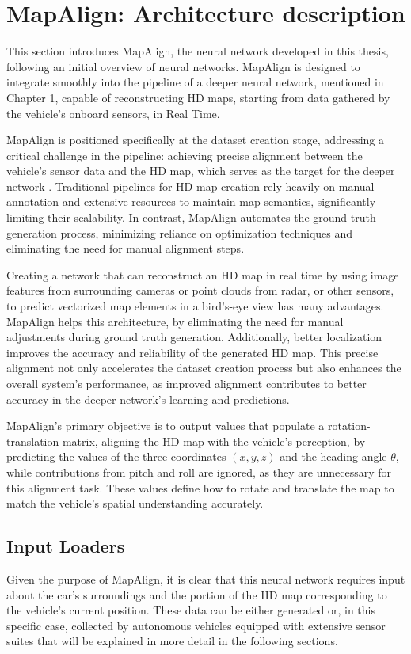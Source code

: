 \section{MapAlign: Architecture description}
This section introduces MapAlign, the neural network developed in this thesis, following an initial overview of neural networks. MapAlign is designed to integrate smoothly into the pipeline of a deeper neural network, mentioned in Chapter 1, capable of reconstructing HD maps, starting from data gathered by the vehicle's onboard sensors, in Real Time.

MapAlign is positioned specifically at the dataset creation stage, addressing a critical challenge in the pipeline: achieving precise alignment between the vehicle's sensor data and the HD map, which serves as the target for the deeper network \cite{Li_HDMapNet_2022}. Traditional pipelines for HD map creation rely heavily on manual annotation and extensive resources to maintain map semantics, significantly limiting their scalability. In contrast, MapAlign automates the ground-truth generation process, minimizing reliance on optimization techniques and eliminating the need for manual alignment steps.

Creating a network that can reconstruct an HD map in real time by using image features from surrounding cameras or point clouds from radar, or other sensors, to predict vectorized map elements in a bird’s-eye view has many advantages. MapAlign helps this architecture, by eliminating the need for manual adjustments during ground truth generation. Additionally, better localization improves the accuracy and reliability of the generated HD map. This precise alignment not only accelerates the dataset creation process but also enhances the overall system’s performance, as improved alignment contributes to better accuracy in the deeper network's learning and predictions.


MapAlign’s primary objective is to output values that populate a rotation-translation matrix, aligning the HD map with the vehicle’s perception, by predicting the values of the three coordinates \( (x, y, z) \) and the heading angle \( \theta \), while contributions from pitch and roll are ignored, as they are unnecessary for this alignment task. These values define how to rotate and translate the map to match the vehicle's spatial understanding accurately. 

\subsection{Input Loaders}
Given the purpose of MapAlign, it is clear that this neural network requires input about the car's surroundings and the portion of the HD map corresponding to the vehicle's current position. These data can be either generated or, in this specific case, collected by autonomous vehicles equipped with extensive sensor suites that will be explained in more detail in the following sections.

